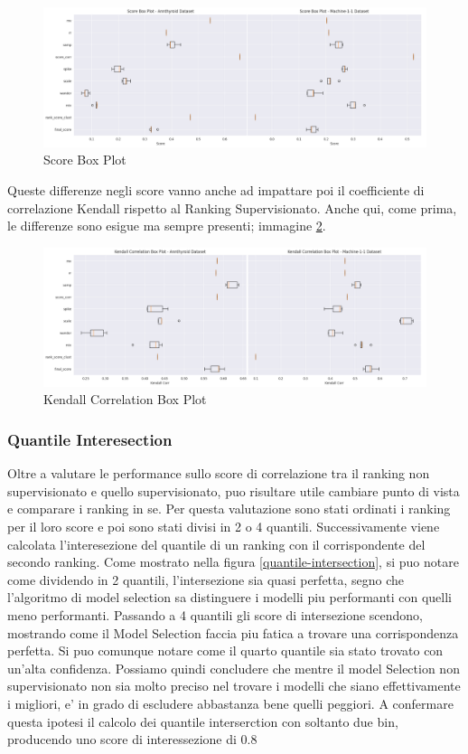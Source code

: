\begin{figure}[t]
	\centering
	\includegraphics[width=15cm, scale=1]{images/score_box}
	\caption{Score Box Plot}
	\label{score-box}
	
\end{figure}

Queste differenze negli score vanno anche ad impattare poi il coefficiente di correlazione Kendall rispetto al Ranking Supervisionato. Anche qui, come prima, le differenze sono esigue ma sempre presenti; immagine \ref{kendall-box}.

\begin{figure}[t]
	\centering
	\includegraphics[width=15cm, scale=1]{images/kendall_box}
	\caption{Kendall Correlation Box Plot}
	\label{kendall-box}
		
\end{figure}


\subsubsection{Quantile Interesection}
Oltre a valutare le performance sullo score di correlazione tra il ranking non supervisionato e quello supervisionato, puo risultare utile cambiare punto di vista e comparare i ranking in se.
Per questa valutazione sono stati ordinati i ranking per il loro score e poi sono stati divisi in 2 o 4 quantili. Successivamente viene calcolata l'interesezione del quantile di un ranking con il corrispondente del secondo ranking.
Come mostrato nella figura \ref{quantile-intersection}, si puo notare come dividendo in 2 quantili, l'intersezione sia quasi perfetta, segno che l'algoritmo di model selection sa distinguere i modelli piu performanti con quelli meno performanti.
Passando a 4 quantili gli score di intersezione scendono, mostrando come il Model Selection faccia piu fatica a trovare una corrispondenza perfetta. Si puo comunque notare come il quarto quantile sia stato trovato con un'alta confidenza.
Possiamo quindi concludere che mentre il model Selection non supervisionato non sia molto preciso nel trovare i modelli che siano effettivamente i migliori, e' in grado di escludere abbastanza bene quelli peggiori. A confermare questa ipotesi il calcolo dei quantile interserction con soltanto due bin, producendo uno score di interessezione di \(0.8\)

